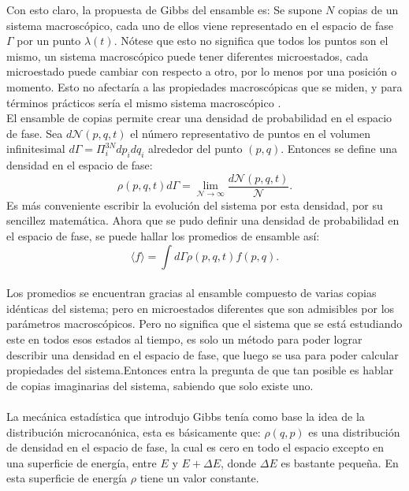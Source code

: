 Con esto claro, la propuesta de Gibbs del ensamble es: Se supone $N$ copias de un sistema macroscópico, cada uno de ellos viene representado en el espacio de fase $\Gamma$ por un punto $\lambda(t)$. Nótese que esto no significa  que todos los puntos son el mismo, un sistema macroscópico puede tener diferentes microestados, cada microestado puede cambiar con respecto a otro, por lo menos por una posición o momento. Esto no afectaría a las propiedades macroscópicas que se miden, y para términos prácticos sería el mismo sistema macroscópico \cite{KardarStat}.
\\
El ensamble de copias permite crear una densidad de probabilidad en el espacio de fase. Sea $d\mathcal{N}(p,q,t)$ el número representativo de puntos en el volumen infinitesimal $d\Gamma = \Pi^{3N}_{i}dp_{i}dq_{i}$ alrededor del punto $(p,q)$. Entonces se define una densidad en el espacio de fase:
\begin{equation}
\rho(p,q,t)d\Gamma= \lim_{\mathcal{N} \to \infty} \frac{d\mathcal{N}(p,q,t)}{\mathcal{N}}.
\end{equation}
Es más conveniente escribir la evolución del sistema por esta densidad, por su sencillez matemática. 
Ahora que se pudo definir una densidad de probabilidad en el espacio de fase, se puede hallar los promedios de ensamble así:
\begin{equation}
\langle f \rangle = \int d\Gamma \rho(p,q,t) f(p,q).
\end{equation}
\\
Los promedios se encuentran gracias al ensamble compuesto de varias copias idénticas del sistema; pero en microestados diferentes que son admisibles por los parámetros macroscópicos. Pero no significa que el sistema que se está estudiando este en todos esos estados al tiempo, es solo un método para poder lograr describir una densidad en el espacio de fase, que luego se usa para poder calcular propiedades del sistema.Entonces entra la pregunta de que tan posible es hablar de copias imaginarias del sistema, sabiendo que solo existe uno. 
\\
\\
La mecánica estadística que introdujo Gibbs tenía como base la idea de la distribución microcanónica, esta es básicamente que: $\rho(q,p)$ es una distribución de densidad en el espacio de fase, la cual es cero en todo el espacio excepto en una superficie de energía, entre $E$ y $E+ \Delta E$, donde $\Delta E$ es bastante pequeña. En esta superficie de energía $\rho$ tiene un valor constante. 
\\
